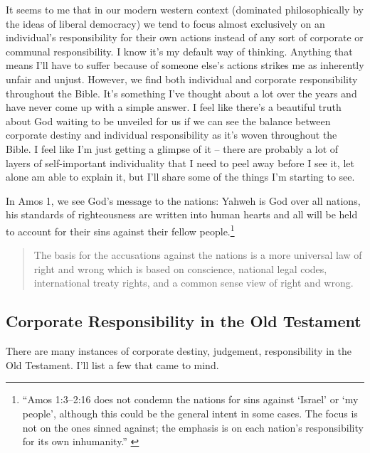 It seems to me that in our modern western context (dominated philosophically by
the ideas of liberal democracy) we tend to focus almost exclusively on an
individual's responsibility for their own actions instead of any sort of
corporate or communal responsibility. I know it's my default way of thinking.
Anything that means I'll have to suffer because of someone else's actions
strikes me as inherently unfair and unjust. However, we find both individual and
corporate responsibility throughout the Bible. It's something I've thought about
a lot over the years and have never come up with a simple answer. I feel like
there's a beautiful truth about God waiting to be unveiled for us if we can see
the balance between corporate destiny and individual responsibility as it's
woven throughout the Bible. I feel like I'm just getting a glimpse of it --
there are probably a lot of layers of self-important individuality that I need
to peel away before I see it, let alone am able to explain it, but I'll share
some of the things I'm starting to see.

In Amos 1, we see God's message to the nations: Yahweh is God over all nations,
his standards of righteousness are written into human hearts and all will be
held to account for their sins against their fellow people.\footnote{%
\enquote{Amos 1:3--2:16 does not condemn the nations for sins against
\enquote{Israel} or \enquote{my people}, although this could be the general
intent in some cases. The focus is not on the ones sinned against; the
emphasis is on each nation's responsibility for its own inhumanity.}
\autocite[57]{smith:2017}
}

\begin{quote}
    The basis for the accusations against the nations is a more universal law of
    right and wrong which is based on conscience, national legal codes,
    international treaty rights, and a common sense view of right and wrong.
    \autocite[59]{smith:2017}
\end{quote}



\subsection{Corporate Responsibility in the Old Testament}

There are many instances of corporate destiny, judgement, responsibility in the
Old Testament. I'll list a few that came to mind.

